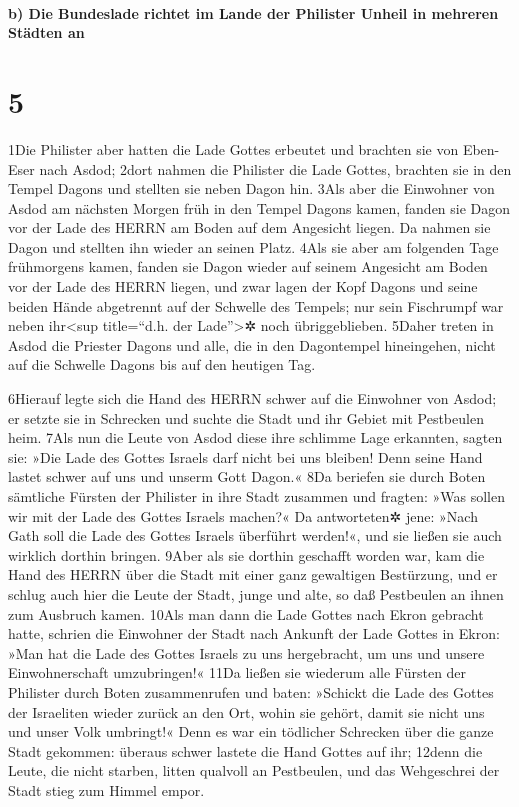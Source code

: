 \hypertarget{b-die-bundeslade-richtet-im-lande-der-philister-unheil-in-mehreren-stuxe4dten-an}{%
\paragraph{b) Die Bundeslade richtet im Lande der Philister Unheil in
mehreren Städten
an}\label{b-die-bundeslade-richtet-im-lande-der-philister-unheil-in-mehreren-stuxe4dten-an}}

\hypertarget{section-4}{%
\section{5}\label{section-4}}

1Die Philister aber hatten die Lade Gottes erbeutet und brachten sie von
Eben-Eser nach Asdod; 2dort nahmen die Philister die Lade Gottes,
brachten sie in den Tempel Dagons und stellten sie neben Dagon hin. 3Als
aber die Einwohner von Asdod am nächsten Morgen früh in den Tempel
Dagons kamen, fanden sie Dagon vor der Lade des HERRN am Boden auf dem
Angesicht liegen. Da nahmen sie Dagon und stellten ihn wieder an seinen
Platz. 4Als sie aber am folgenden Tage frühmorgens kamen, fanden sie
Dagon wieder auf seinem Angesicht am Boden vor der Lade des HERRN
liegen, und zwar lagen der Kopf Dagons und seine beiden Hände abgetrennt
auf der Schwelle des Tempels; nur sein Fischrumpf war neben
ihr\textless sup title=``d.h. der Lade''\textgreater✲ noch
übriggeblieben. 5Daher treten in Asdod die Priester Dagons und alle, die
in den Dagontempel hineingehen, nicht auf die Schwelle Dagons bis auf
den heutigen Tag.

6Hierauf legte sich die Hand des HERRN schwer auf die Einwohner von
Asdod; er setzte sie in Schrecken und suchte die Stadt und ihr Gebiet
mit Pestbeulen heim. 7Als nun die Leute von Asdod diese ihre schlimme
Lage erkannten, sagten sie: »Die Lade des Gottes Israels darf nicht bei
uns bleiben! Denn seine Hand lastet schwer auf uns und unserm Gott
Dagon.« 8Da beriefen sie durch Boten sämtliche Fürsten der Philister in
ihre Stadt zusammen und fragten: »Was sollen wir mit der Lade des Gottes
Israels machen?« Da antworteten✲ jene: »Nach Gath soll die Lade des
Gottes Israels überführt werden!«, und sie ließen sie auch wirklich
dorthin bringen. 9Aber als sie dorthin geschafft worden war, kam die
Hand des HERRN über die Stadt mit einer ganz gewaltigen Bestürzung, und
er schlug auch hier die Leute der Stadt, junge und alte, so daß
Pestbeulen an ihnen zum Ausbruch kamen. 10Als man dann die Lade Gottes
nach Ekron gebracht hatte, schrien die Einwohner der Stadt nach Ankunft
der Lade Gottes in Ekron: »Man hat die Lade des Gottes Israels zu uns
hergebracht, um uns und unsere Einwohnerschaft umzubringen!« 11Da ließen
sie wiederum alle Fürsten der Philister durch Boten zusammenrufen und
baten: »Schickt die Lade des Gottes der Israeliten wieder zurück an den
Ort, wohin sie gehört, damit sie nicht uns und unser Volk umbringt!«
Denn es war ein tödlicher Schrecken über die ganze Stadt gekommen:
überaus schwer lastete die Hand Gottes auf ihr; 12denn die Leute, die
nicht starben, litten qualvoll an Pestbeulen, und das Wehgeschrei der
Stadt stieg zum Himmel empor.

